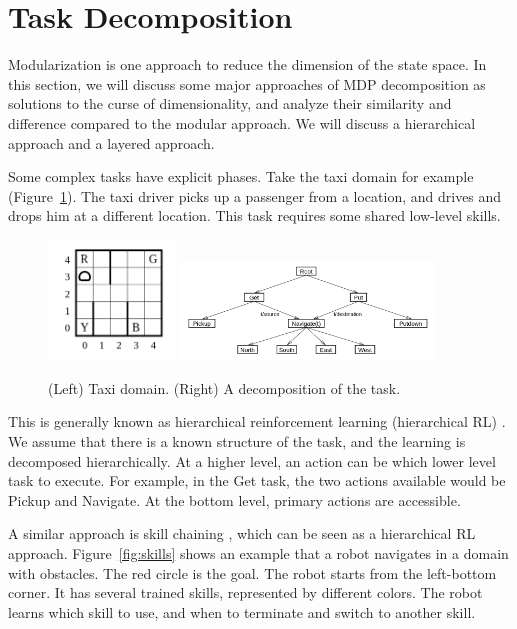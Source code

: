 \section{Task Decomposition}

Modularization is one approach to reduce the dimension of the state space. In
this section, we will discuss some major approaches of MDP decomposition as
solutions to the curse of dimensionality, and analyze their similarity and
difference compared to the modular approach. We will discuss a hierarchical
approach and a layered approach.

Some complex tasks have explicit phases. Take the taxi domain for example
(Figure~\ref{fig:taxi}). The taxi driver picks up a passenger from a location,
and drives and drops him at a different location. This task requires some shared
low-level skills.

\begin{figure}[h]
\centering
\includegraphics[width=0.3\textwidth]{taxi.png}
\includegraphics[width=0.6\textwidth]{maxq.png}
\caption{(Left) Taxi domain. (Right) A decomposition of the task.}
\label{fig:taxi}
\end{figure}

This is generally known as hierarchical reinforcement learning (hierarchical RL)
\cite{dietterich2000hierarchical}.
We assume that there is a known structure of the task, and the
learning is decomposed hierarchically. At a higher level, an action can be
which lower level task to execute. For example, in the Get task, the two actions
available would be Pickup and Navigate. At the bottom level, primary actions are
accessible.

A similar approach is skill chaining \cite{konidaris2009skill}, which can
be seen as a hierarchical RL approach. Figure~\ref{fig:skills} shows
an example that a robot navigates in a domain with obstacles. The red circle is
the goal. The robot starts from the left-bottom corner. It has several trained
skills, represented by different colors. The robot learns which skill to use,
and when to terminate and switch to another skill.

